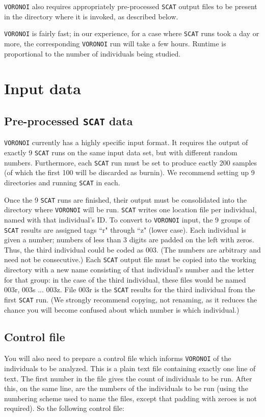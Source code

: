 \documentclass[10pt,titlepage,times,letterpaper]{article}
\def\SCAT{{\tt SCAT} }
\def\VORONOI{{\tt VORONOI} }
\begin{document}
\VORONOI also requires appropriately pre-processed \SCAT output files to be present in the
directory where it is invoked, as described below.

\VORONOI is fairly fast; in our experience, for a case where \SCAT runs took a day or 
more, the corresponding \VORONOI run will take a few hours.  Runtime is proportional to
the number of individuals being studied.

\section{Input data}

\subsection{Pre-processed \SCAT data}

\VORONOI currently has a highly specific input format.  It requires the output of exactly
9 \SCAT runs on the same input data set, but with different random numbers.  Furthermore,
each \SCAT run must be set to produce eactly 200 samples (of which the first 100 will be
discarded as burnin).  We recommend setting up 9 directories and running \SCAT in each.

Once the 9 \SCAT runs are finished, their output must be consolidated into the directory
where \VORONOI will be run.
\SCAT writes one location file per individual, named with that individual's ID. 
To convert to \VORONOI input, the 9 groups of \SCAT
results are assigned tags ``r" through ``z" (lower case).  Each individual is 
given a number; numbers of less than 3 digits are padded on the left with zeros.  Thus, the
third individual could be coded as 003.  (The numbers are arbitrary and need not 
be consecutive.)  Each \SCAT output file must be copied into the working
directory with a new name consisting of that individual's number
and the letter for that group:  in the case of the third individual, these files would
be named 003r, 003s ... 003z.  File 003r is the \SCAT results for the third individual from
the first \SCAT run.  (We strongly recommend copying, not renaming, as it reduces
the chance you will become confused about which number is which individual.)

\subsection{Control file}

You will also need to prepare a control file which informs \VORONOI of the
individuals to be analyzed.  This is a plain text file containing exactly one line of
text.  The first number in the file gives the count of individuals to be run.
After this, on the same line, are the numbers of the individuals to be run (using the
numbering scheme used to name the files, except that padding with zeroes is not
required).  So the following control file:
\end{document}
